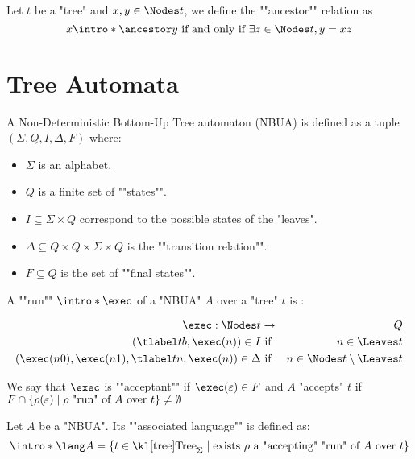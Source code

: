 \documentclass{article}
\begin{document}
\begin{definition}
	Let $t$ be a "tree" and $x, y \in \Nodes t$, we define the ""ancestor"" relation as
	\[  x \intro* \ancestor y \tiff \exists z \in \Nodes t, y = xz \]
\end{definition}

\section{Tree Automata}

\begin{definition}
	A Non-Deterministic Bottom-Up Tree automaton (NBUA) is defined as a tuple
	$(\Sigma, Q, I, \Delta, F)$ where:
	\begin{itemize}
		\item $\Sigma$ is an alphabet.
		\item $Q$ is a finite set of ""states"".
		\item $I \subseteq \Sigma \times Q$ correspond to the possible states of the "leaves".
		\item $\Delta \subseteq Q \times Q \times \Sigma \times Q$ is the ""transition relation"".
		\item $F \subseteq Q$ is the set of ""final states"".
	\end{itemize}
\end{definition}

\begin{definition}
	A ""run"" $\intro* \exec$ of a "NBUA" $A$ over a "tree" $t$ is :

	\begin{eqnarray*}
		\exec : \Nodes t &\to& Q \\
		(\tlabel t b,  \exec (n) ) \in I &\text{ if }& n \in \Leaves t \\
		(\exec (n0), \exec (n1), \tlabel t n, \exec (n)) \in \Delta &\text{ if }& n \in \Nodes t \setminus \Leaves t
	\end{eqnarray*}

	We say that $\exec$ is ""acceptant"" if $\exec (\varepsilon) \in F$ and $A$ "accepts" $t$ if
	$F \cap \left\{\rho(\varepsilon) \mid \text{$\rho$ "run" of~$A$ over~$t$}\right\} \neq \emptyset$
\end{definition}


\begin{definition}
	Let $A$ be a "NBUA". Its ""associated language"" is defined as:
	\[\intro* \lang A = \setdef {t \in \tree_{\Sigma}} {\text{exists $\rho$ a "accepting" "run" of $A$ over $t$}} \]
\end{definition}
\end{document}
